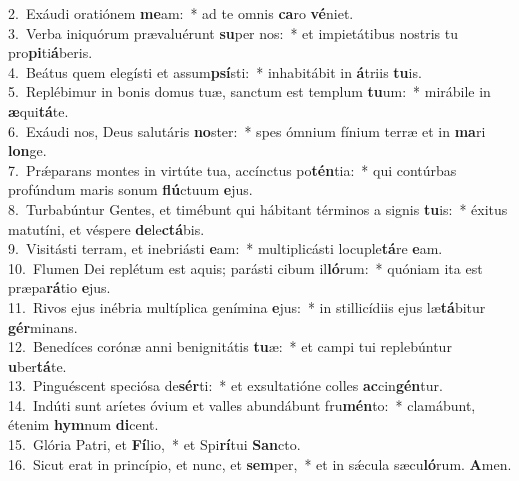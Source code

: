 {2.~}Exáudi oratiónem \textbf{me}am:~* ad te omnis \textbf{ca}ro \textbf{vé}niet.\\
{3.~}Verba iniquórum prævaluérunt \textbf{su}per nos:~* et impietátibus nostris tu pro\textbf{pi}ti\textbf{á}beris.\\
{4.~}Beátus quem elegísti et assum\textbf{psí}sti:~* inhabitábit in \textbf{á}triis \textbf{tu}is.\\
{5.~}Replébimur in bonis domus tuæ, sanctum est templum \textbf{tu}um:~* mirábile in \textbf{æ}qui\textbf{tá}te.\\
{6.~}Exáudi nos, Deus salutáris \textbf{no}ster:~* spes ómnium fínium terræ et in \textbf{ma}ri \textbf{lon}ge.\\
{7.~}Prǽparans montes in virtúte tua, accínctus po\textbf{tén}tia:~* qui contúrbas profúndum maris sonum \textbf{flú}ctuum \textbf{e}jus.\\
{8.~}Turbabúntur Gentes, et timébunt qui hábitant términos a signis \textbf{tu}is:~* éxitus matutíni, et véspere \textbf{de}le\textbf{ctá}bis.\\
{9.~}Visitásti terram, et inebriásti \textbf{e}am:~* multiplicásti locuple\textbf{tá}re \textbf{e}am.\\
{10.~}Flumen Dei replétum est aquis; parásti cibum il\textbf{ló}rum:~* quóniam ita est præpa\textbf{rá}tio \textbf{e}jus.\\
{11.~}Rivos ejus inébria multíplica genímina \textbf{e}jus:~* in stillicídiis ejus læ\textbf{tá}bitur \textbf{gér}minans.\\
{12.~}Benedíces corónæ anni benignitátis \textbf{tu}æ:~* et campi tui replebúntur \textbf{u}ber\textbf{tá}te.\\
{13.~}Pinguéscent speciósa de\textbf{sér}ti:~* et exsultatióne colles \textbf{ac}cin\textbf{gén}tur.\\
{14.~}Indúti sunt aríetes óvium et valles abundábunt fru\textbf{mén}to:~* clamábunt, étenim \textbf{hym}num \textbf{di}cent.\\
{15.~}Glória Patri, et \textbf{Fí}lio,~* et Spi\textbf{rí}tui \textbf{San}cto.\\
{16.~}Sicut erat in princípio, et nunc, et \textbf{sem}per,~* et in sǽcula sæcu\textbf{ló}rum. \textbf{A}men.\\
